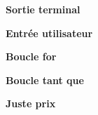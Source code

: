 
\textbf{Sortie terminal}


\textbf{Entrée utilisateur}


\textbf{Boucle for}



\textbf{Boucle tant que}




\textbf{Juste prix}


